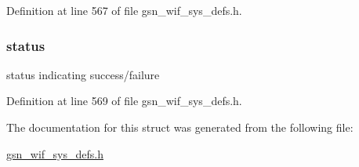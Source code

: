 Definition at line 567 of file gsn\_\-wif\_\-sys\_\-defs.h.

\hypertarget{a00351_ac6b7193d1fe7063cf448ef96398230d8}{
\subsubsection[{status}]{ {\bf status}}}
\label{a00351_ac6b7193d1fe7063cf448ef96398230d8}
status indicating success/failure 

Definition at line 569 of file gsn\_\-wif\_\-sys\_\-defs.h.



The documentation for this struct was generated from the following file:\begin{DoxyCompactItemize}
\item 
\hyperlink{a00612}{gsn\_\-wif\_\-sys\_\-defs.h}\end{DoxyCompactItemize}
